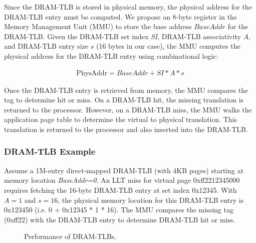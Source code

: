 
\noindent Since the DRAM-TLB is stored in physical memory, the
physical address for the DRAM-TLB entry must be computed. We propose
an 8-byte register in the Memory Management Unit (MMU) to store the
base address $BaseAddr$ for the DRAM-TLB. Given the DRAM-TLB set index
{\em SI}, DRAM-TLB associativity $A$, and DRAM-TLB entry size $s$ (16
bytes in our case), the MMU computes the physical address for the
DRAM-TLB entry using combinational logic:

\begin{equation}
  \begin{array}{rl}
    \text{PhysAddr} = BaseAddr + SI * A * s
  \end{array}
\end{equation}

\noindent Once the DRAM-TLB entry is retrieved from memory, the MMU
compares the tag to determine hit or miss. On a DRAM-TLB hit, the
missing translation is returned to the processor. However, on a
DRAM-TLB miss, the MMU walks the application page table to determine
the virtual to physical translation. This translation is returned to
the processor and also inserted into the DRAM-TLB.

\subsubsection{DRAM-TLB Example}

\noindent Assume a 1M-entry direct-mapped DRAM-TLB (with 4KB pages)
starting at memory location {\em BaseAddr=0}. An LLT miss for virtual
page 0xff2212345000 requires fetching the 16-byte DRAM-TLB entry at
set index 0x12345. With $A=1$ and $s=16$, the physical memory location
for this DRAM-TLB entry is 0x123450 (i.e. 0 + 0x12345 * 1 * 16). The
MMU compares the missing tag (0xff22) with the DRAM-TLB entry to
determine DRAM-TLB hit or miss.


\begin{figure}[tp] 
  \vspace{-0.in} \centering
  \centerline{}

  \caption{\small Performance of DRAM-TLBs. \normalsize}
  \label{fig:perf_DRAMTLB} 
  \vspace{0.2 in}
\end{figure}

